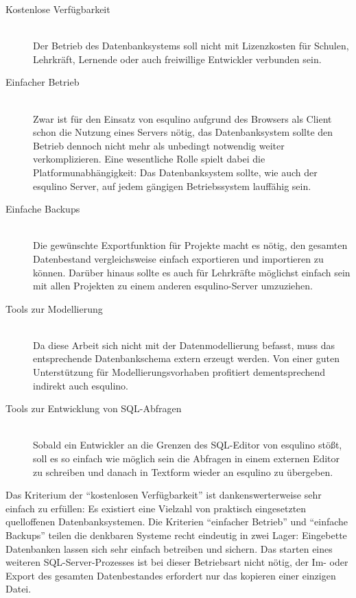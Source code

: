 \begin{description}  
\item[Kostenlose Verfügbarkeit] \hfill \\
  Der Betrieb des Datenbanksystems soll nicht mit Lizenzkosten für Schulen, Lehrkräft, Lernende oder auch freiwillige Entwickler verbunden sein.
\item[Einfacher Betrieb] \hfill \\
  Zwar ist für den Einsatz von esqulino aufgrund des Browsers als Client schon die Nutzung eines Servers nötig, das Datenbanksystem sollte den Betrieb dennoch nicht mehr als unbedingt notwendig weiter verkomplizieren. Eine wesentliche Rolle spielt dabei die Platformunabhängigkeit: Das Datenbanksystem sollte, wie auch der esqulino Server, auf jedem gängigen Betriebssystem lauffähig sein.
\item[Einfache Backups] \hfill \\
  Die gewünschte Exportfunktion für Projekte macht es nötig, den gesamten Datenbestand vergleichsweise einfach exportieren und importieren zu können. Darüber hinaus sollte es auch für Lehrkräfte möglichst einfach sein mit allen Projekten zu einem anderen esqulino-Server umzuziehen.
\item[Tools zur Modellierung] \hfill \\
  Da diese Arbeit sich nicht mit der Datenmodellierung befasst, muss das entsprechende Datenbankschema extern erzeugt werden. Von einer guten Unterstützung für Modellierungsvorhaben profitiert dementsprechend indirekt auch esqulino.
\item[Tools zur Entwicklung von SQL-Abfragen] \hfill \\
  Sobald ein Entwickler an die Grenzen des SQL-Editor von esqulino stößt, soll es so einfach wie möglich sein die Abfragen in einem externen Editor zu schreiben und danach in Textform wieder an esqulino zu übergeben.
\end{description}

Das Kriterium der ``kostenlosen Verfügbarkeit'' ist dankenswerterweise sehr einfach zu erfüllen: Es existiert eine Vielzahl von praktisch eingesetzten quelloffenen Datenbanksystemen. Die Kriterien ``einfacher Betrieb'' und ``einfache Backups'' teilen die denkbaren Systeme recht eindeutig in zwei Lager: Eingebette Datenbanken lassen sich sehr einfach betreiben und sichern. Das starten eines weiteren SQL-Server-Prozesses ist bei dieser Betriebsart nicht nötig, der Im- oder Export des gesamten Datenbestandes erfordert nur das kopieren einer einzigen Datei.

